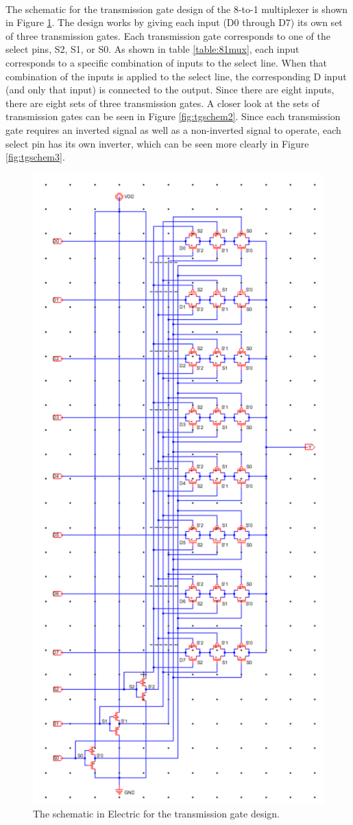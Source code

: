 \documentclass{article}
\begin{document}
    \paragraph{}
    The schematic for the transmission gate design of the 8-to-1 multiplexer is shown in Figure \ref{fig:tgschem1}. The design works by giving each input (D0 through D7) its own set of three transmission gates. Each transmission gate corresponds to one of the select pins, S2, S1, or S0. As shown in table \ref{table:81mux}, each input corresponds to a specific combination of inputs to the select line. When that combination of the inputs is applied to the select line, the corresponding D input (and only that input) is connected to the output. Since there are eight inputs, there are eight sets of three transmission gates. A closer look at the sets of transmission gates can be seen in Figure \ref{fig:tgschem2}. Since each transmission gate requires an inverted signal as well as a non-inverted signal to operate, each select pin has its own inverter, which can be seen more clearly in Figure \ref{fig:tgschem3}.



    \begin{figure}[H]
      \centering
      \includegraphics[width=0.7\linewidth, frame]{screenshots/tg/schem/schem1.png}
      \caption{The schematic in Electric for the transmission gate design.}
      \label{fig:tgschem1}
    \end{figure}
\end{document}
